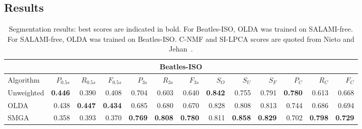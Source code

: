\documentclass{article}
\begin{document}
\subsection{Results}
\label{sec:results}
\begin{table}
\centering
\caption{Segmentation results: best scores are indicated in bold. For Beatles-ISO, OLDA was trained on SALAMI-free. For
SALAMI-free, OLDA was trained on Beatles-ISO.  C-NMF and SI-LPCA scores are quoted from Nieto and Jehan~\cite{nieto2013convex}.\label{tab:results}}
\footnotesize
\begin{tabular}{lrrrrrrrrrrrr}
\multicolumn{13}{c}{Beatles-ISO}\\
\toprule%
Algorithm   &   $P_{0.5s}$ & $R_{0.5s}$ & $F_{0.5s}$ & $P_{3s}$     & $R_{3s}$  & $F_{3s}$   & $S_O$ & $S_U$ & $S_F$ & $P_C$& $R_C$& $F_C$\\
\hline
Unweighted  &   \textbf{0.446} & 0.390 & 0.408 & 0.704   & 0.603 & 0.640 & \textbf{0.842} & 0.755 & 0.791 & \textbf{0.780} & 0.613 & 0.668\\
OLDA        &   0.438 & \textbf{0.447} & \textbf{0.434} & 0.685   & 0.680 & 0.670 & 0.828 & 0.808 & 0.813 & 0.744 & 0.686 & 0.694\\
\hline
SMGA~\hfill\cite{serra2012unsupervised}
            &   0.358 & 0.393 & 0.370 & \textbf{0.769}   & \textbf{0.808} & \textbf{0.780} & 0.811 & \textbf{0.858} & \textbf{0.829} & 0.702 & \textbf{0.798} &
            \textbf{0.729}\\
\toprule%


\end{tabular}
\end{table}
\end{document}
